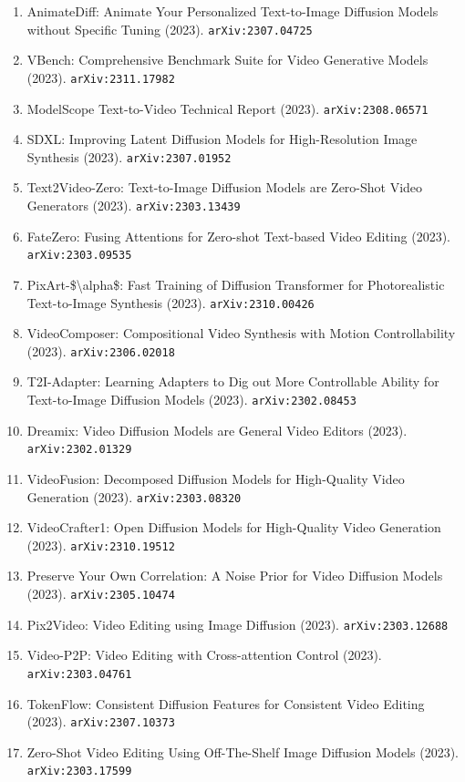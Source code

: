 \documentclass[11pt]{article}
\begin{document}
\begin{enumerate}
  \item AnimateDiff: Animate Your Personalized Text-to-Image Diffusion Models
  without Specific Tuning (2023). \texttt{arXiv:2307.04725}
  \item VBench: Comprehensive Benchmark Suite for Video Generative Models (2023). \texttt{arXiv:2311.17982}
  \item ModelScope Text-to-Video Technical Report (2023). \texttt{arXiv:2308.06571}
  \item SDXL: Improving Latent Diffusion Models for High-Resolution Image
  Synthesis (2023). \texttt{arXiv:2307.01952}
  \item Text2Video-Zero: Text-to-Image Diffusion Models are Zero-Shot Video
  Generators (2023). \texttt{arXiv:2303.13439}
  \item FateZero: Fusing Attentions for Zero-shot Text-based Video Editing (2023). \texttt{arXiv:2303.09535}
  \item PixArt-\$\textbackslash{}alpha\$: Fast Training of Diffusion Transformer for
  Photorealistic Text-to-Image Synthesis (2023). \texttt{arXiv:2310.00426}
  \item VideoComposer: Compositional Video Synthesis with Motion Controllability (2023). \texttt{arXiv:2306.02018}
  \item T2I-Adapter: Learning Adapters to Dig out More Controllable Ability for
  Text-to-Image Diffusion Models (2023). \texttt{arXiv:2302.08453}
  \item Dreamix: Video Diffusion Models are General Video Editors (2023). \texttt{arXiv:2302.01329}
  \item VideoFusion: Decomposed Diffusion Models for High-Quality Video
  Generation (2023). \texttt{arXiv:2303.08320}
  \item VideoCrafter1: Open Diffusion Models for High-Quality Video Generation (2023). \texttt{arXiv:2310.19512}
  \item Preserve Your Own Correlation: A Noise Prior for Video Diffusion Models (2023). \texttt{arXiv:2305.10474}
  \item Pix2Video: Video Editing using Image Diffusion (2023). \texttt{arXiv:2303.12688}
  \item Video-P2P: Video Editing with Cross-attention Control (2023). \texttt{arXiv:2303.04761}
  \item TokenFlow: Consistent Diffusion Features for Consistent Video Editing (2023). \texttt{arXiv:2307.10373}
  \item Zero-Shot Video Editing Using Off-The-Shelf Image Diffusion Models (2023). \texttt{arXiv:2303.17599}

\end{enumerate}
\end{document}
